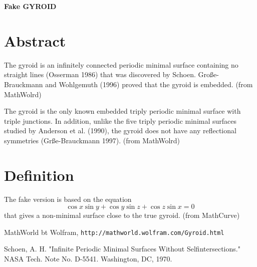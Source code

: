 \documentclass[12pt,dvipdfmx]{article}
\begin{document}
\begin{center}

{\bf \Large Fake GYROID}

\end{center}


\section{Abstract}

The gyroid is an infinitely connected periodic minimal surface containing no straight lines (Osserman 1986) that was discovered by Schoen\cite{Schoen}. Gro\ss e-Brauckmann and Wohlgemuth (1996) proved that the gyroid is embedded. (from MathWolrd)

The gyroid is the only known embedded triply periodic minimal surface with triple junctions. In addition, unlike the five triply periodic minimal surfaces studied by Anderson et al. (1990), the gyroid does not have any reflectional symmetries (Gr\ss e-Brauckmann 1997). (from MathWolrd)

\section{Definition}

The fake version is based on the equation 
\[
\cos x \sin y + \cos y \sin z + \cos z \sin x = 0
\]
 that gives a non-minimal surface close to the true gyroid. (from MathCurve)




\begin{thebibliography}{9}

 MathWorld bt Wolfram, \verb|http://mathworld.wolfram.com/Gyroid.html|

 Schoen, A. H. "Infinite Periodic Minimal Surfaces Without Selfintersections." NASA Tech. Note No. D-5541. Washington, DC, 1970.

\end{thebibliography}
\end{document}

